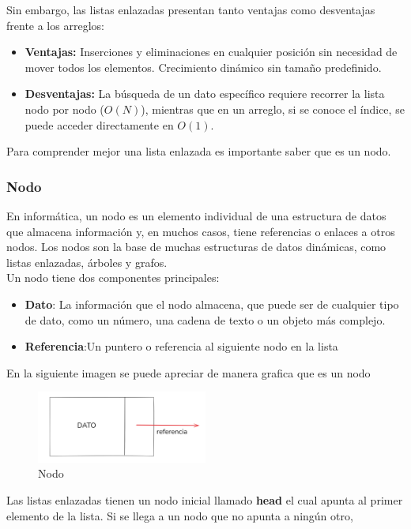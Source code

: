     Sin embargo, las listas enlazadas presentan tanto ventajas como desventajas frente a los arreglos:
    \begin{itemize}
        \item \textbf{Ventajas:} Inserciones y eliminaciones en cualquier posición sin necesidad de mover todos los elementos. Crecimiento dinámico sin tamaño predefinido.
        \item \textbf{Desventajas:} La búsqueda de un dato específico requiere recorrer la lista nodo por nodo ($O(N)$), mientras que en un arreglo, si se conoce el índice, se puede acceder directamente en $O(1)$.
    \end{itemize}
    
    Para comprender mejor una lista enlazada es importante saber que es un nodo.
        \subsubsection{Nodo}
        En informática, un nodo es un elemento individual de una estructura de datos que almacena información y, en muchos casos, tiene referencias o enlaces a otros nodos. 
        Los nodos son la base de muchas estructuras de datos dinámicas, como listas enlazadas, árboles y grafos.\\
        Un nodo tiene dos componentes principales:
        \begin{itemize}
            \item  \textbf{Dato}: La información que el nodo almacena, que puede ser de cualquier tipo de dato, como un número, una cadena de texto o un objeto más complejo.
            \item  \textbf{Referencia}:Un puntero o referencia al siguiente nodo en la lista
        \end{itemize}
        En la siguiente imagen se puede apreciar de manera grafica que es un nodo
        \begin{figure}[H]
            \centering %
            \includegraphics[width=0.5\textwidth]{./src/images/Nodo.png} 
            \caption{Nodo} 
            \label{fig: nodo} 
        \end{figure}
    Las listas enlazadas tienen un nodo inicial llamado \textbf{head} el cual apunta al primer elemento de la lista. Si se llega a un nodo que no apunta a ningún otro, 
